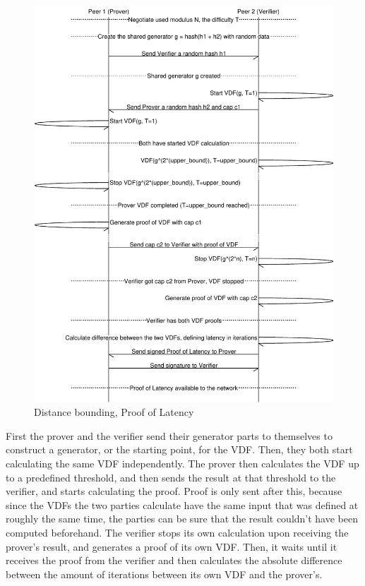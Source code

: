 \begin{figure}
	\includegraphics[width=\textwidth]{pictures/pol2_diagram-eps-converted-to.pdf}
	\caption{Distance bounding, Proof of Latency}
	\label{PoL Diagram 2}
\end{figure}

First the prover and the verifier send their generator parts to themselves to construct a generator, or the starting point, for the VDF. Then, they both start calculating the same VDF independently. The prover then calculates the VDF up to a predefined threshold, and then sends the result at that threshold to the verifier, and starts calculating the proof. Proof is only sent after this, because since the VDFs the two parties calculate have the same input that was defined at roughly the same time, the parties can be sure that the result couldn't have been computed beforehand. The verifier stops its own calculation upon receiving the prover's result, and generates a proof of its own VDF. Then, it waits until it receives the proof from the verifier and then calculates the absolute difference between the amount of iterations between its own VDF and the prover's.

